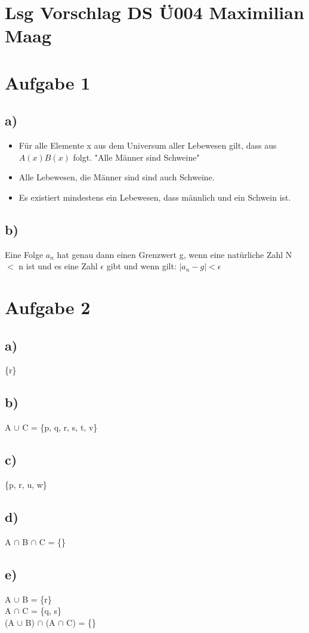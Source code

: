 \documentclass{article}
\begin{document}
	\section*{Lsg Vorschlag DS Ü004 Maximilian Maag}
	\section*{Aufgabe 1}
	\subsection*{a)}
	\begin{itemize}
		\item Für alle Elemente x aus dem Universum aller Lebewesen gilt, dass aus $A(x) B(x)$ folgt. "Alle Männer sind Schweine"
		\item Alle Lebewesen, die Männer sind sind auch Schweine.
		\item Es existiert mindestens ein Lebewesen, dass männlich und ein Schwein ist.
	\end{itemize}
	\subsection*{b)}
	Eine Folge $a_{n}$ hat genau dann einen Grenzwert g, wenn eine natürliche Zahl N $<$ n ist und es eine Zahl $\epsilon$ gibt und wenn gilt: $| a_{n} - g| < \epsilon $
	\section*{Aufgabe 2}
	\subsection*{a)}
	\{r\}
	\subsection*{b)}
	A $\cup$ C = \{p, q, r, s, t, v\}
	\subsection*{c)}
	\{p, r, u, w\}
	\subsection*{d)}
	A $\cap$ B $\cap$ C = \{\}
	\subsection*{e)}
	A $\cup$ B = \{r\} \\
	A $\cap$ C = \{q, s\} \\
	(A $\cup$ B) $\cap$ (A $\cap$ C) = \{\} \\
\end{document}
